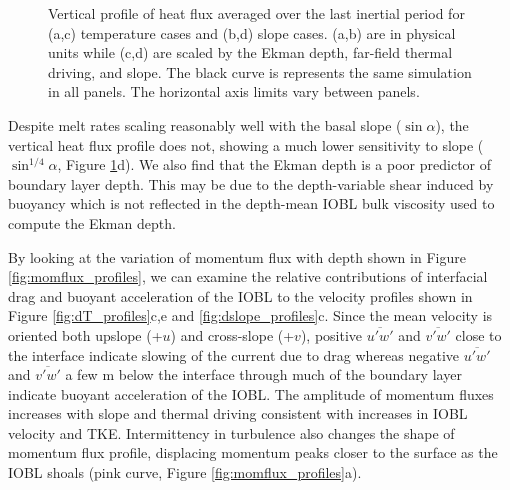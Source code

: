 \documentclass[draft]{agujournal2019}
\begin{document}
\begin{figure}[h!]
\begin{minipage}{0.5\textwidth}
    \end{minipage}
    \caption{Vertical profile of heat flux averaged over the last inertial period for (a,c) temperature cases and (b,d) slope cases. (a,b) are in physical units while (c,d) are scaled by the Ekman depth, far-field thermal driving, and slope. The black curve is represents the same simulation in all panels. The horizontal axis limits vary between panels.} 
    \label{fig:heatflux_profiles}
\end{figure}

Despite melt rates scaling reasonably well with the basal slope ($\sin \alpha$), the vertical heat flux profile does not, showing a much lower sensitivity to slope ($\sin^{1/4}\alpha$, Figure \ref{fig:heatflux_profiles}d). We also find that the Ekman depth is a poor predictor of boundary layer depth. This may be due to the depth-variable shear induced by buoyancy which is not reflected in the depth-mean IOBL bulk viscosity used to compute the Ekman depth. 

By looking at the variation of momentum flux with depth shown in Figure \ref{fig:momflux_profiles}, we can examine the relative contributions of interfacial drag and buoyant acceleration of the IOBL to the velocity profiles shown in Figure \ref{fig:dT_profiles}c,e and \ref{fig:dslope_profiles}c. Since the mean velocity is oriented both upslope (+$u$) and cross-slope (+$v$), positive $\overline{u'w'}$ and $\overline{v'w'}$ close to the interface indicate slowing of the current due to drag whereas negative $\overline{u'w'}$ and $\overline{v'w'}$ a few m below the interface through much of the boundary layer indicate buoyant acceleration of the IOBL. The amplitude of momentum fluxes increases with slope and thermal driving consistent with increases in IOBL velocity and TKE. Intermittency in turbulence also changes the shape of momentum flux profile, displacing momentum peaks closer to the surface as the IOBL shoals (pink curve, Figure \ref{fig:momflux_profiles}a). 
\end{document}
